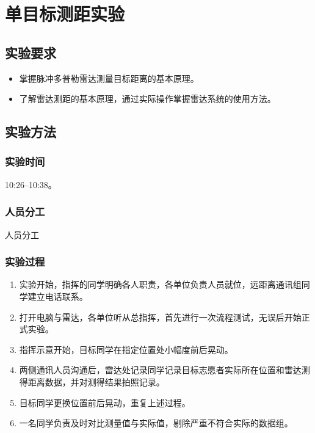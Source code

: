 \documentclass[../main]{subfiles}
\begin{document}
\chapter{单目标测距实验}%
\label{cha:distance}

\section{实验要求}%
\label{sec:requirement}

\begin{itemize}
  \item 掌握脉冲多普勒雷达测量目标距离的基本原理。
  \item 了解雷达测距的基本原理，通过实际操作掌握雷达系统的使用方法。
\end{itemize}

\section{实验方法}%
\label{sec:\arabic{chapter}method}

\subsection{实验时间}%
\label{sub:\arabic{chapter}time}

10:26--10:38。

\subsection{人员分工}%
\label{sub:\arabic{chapter}people}

\begin{table}[htbp]
  \centering
  \caption{人员分工}%
  \label{tab:\arabic{chapter}people}
  \tiny
\end{table}

\subsection{实验过程}%
\label{sub:\arabic{chapter}process}

\begin{enumerate}
  \item 实验开始，指挥的同学明确各人职责，各单位负责人员就位，远距离通讯组同学建立电话联系。
  \item 打开电脑与雷达，各单位听从总指挥，首先进行一次流程测试，无误后开始正式实验。
  \item 指挥示意开始，目标同学在指定位置处小幅度前后晃动。
  \item 两侧通讯人员沟通后，雷达处记录同学记录目标志愿者实际所在位置和雷达测得距离数据，并对测得结果拍照记录。
  \item 目标同学更换位置前后晃动，重复上述过程。
  \item 一名同学负责及时对比测量值与实际值，剔除严重不符合实际的数据组。
\end{enumerate}
\end{document}
